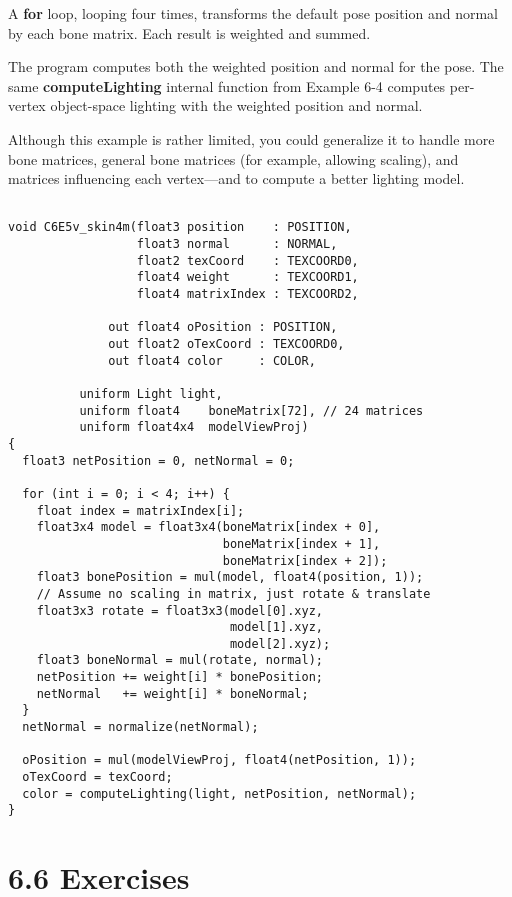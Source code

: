 \documentclass[../main.tex]{subfiles}
\begin{document}
A \textbf{for} loop, looping four times, transforms the default pose position and normal by each bone matrix. Each result is weighted and summed.

The program computes both the weighted position and normal for the pose. The same \textbf{computeLighting} internal function from Example 6-4 computes per-vertex object-space lighting with the weighted position and normal.

Although this example is rather limited, you could generalize it to handle more bone matrices, general bone matrices (for example, allowing scaling), and matrices influencing each vertex—and to compute a better lighting model.

\FloatBarrier
\begin{lstlisting}[caption=Example 6-5. The C6E5v_skin4m Vertex Program]

void C6E5v_skin4m(float3 position    : POSITION,
                  float3 normal      : NORMAL,
                  float2 texCoord    : TEXCOORD0,
                  float4 weight      : TEXCOORD1,
                  float4 matrixIndex : TEXCOORD2,

              out float4 oPosition : POSITION,
              out float2 oTexCoord : TEXCOORD0,
              out float4 color     : COLOR,

          uniform Light light,
          uniform float4    boneMatrix[72], // 24 matrices
          uniform float4x4  modelViewProj)
{
  float3 netPosition = 0, netNormal = 0;

  for (int i = 0; i < 4; i++) {
    float index = matrixIndex[i];
    float3x4 model = float3x4(boneMatrix[index + 0],
                              boneMatrix[index + 1],
                              boneMatrix[index + 2]);
    float3 bonePosition = mul(model, float4(position, 1));
    // Assume no scaling in matrix, just rotate & translate
    float3x3 rotate = float3x3(model[0].xyz,
                               model[1].xyz,
                               model[2].xyz);
    float3 boneNormal = mul(rotate, normal);
    netPosition += weight[i] * bonePosition;
    netNormal   += weight[i] * boneNormal;
  }
  netNormal = normalize(netNormal);

  oPosition = mul(modelViewProj, float4(netPosition, 1));
  oTexCoord = texCoord;
  color = computeLighting(light, netPosition, netNormal);
}
\end{lstlisting}
\FloatBarrier

\section{6.6 Exercises}
\end{document}
